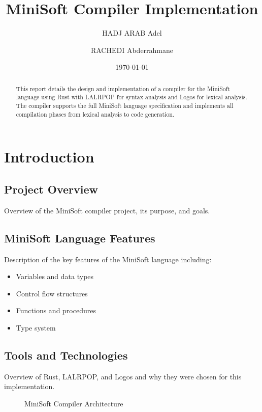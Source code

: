 \documentclass[12pt,a4paper]{article}
\begin{document}
\title{\textbf{MiniSoft Compiler Implementation}}
\author{HADJ ARAB Adel \and RACHEDI Abderrahmane}
\date{\today}
\maketitle

\begin{abstract}
	This report details the design and implementation of a compiler for the MiniSoft language using Rust with LALRPOP for syntax analysis and Logos for lexical analysis. The compiler supports the full MiniSoft language specification and implements all compilation phases from lexical analysis to code generation.
\end{abstract}

\tableofcontents
\newpage

\section{Introduction}
\subsection{Project Overview}
Overview of the MiniSoft compiler project, its purpose, and goals.

\subsection{MiniSoft Language Features}
Description of the key features of the MiniSoft language including:
\begin{itemize}
	\item Variables and data types
	\item Control flow structures
	\item Functions and procedures
	\item Type system
\end{itemize}

\subsection{Tools and Technologies}
Overview of Rust, LALRPOP, and Logos and why they were chosen for this implementation.

\begin{figure}[H]
	\centering
	\caption{MiniSoft Compiler Architecture}
	\label{fig:compiler-architecture}
\end{figure}
\end{document}
